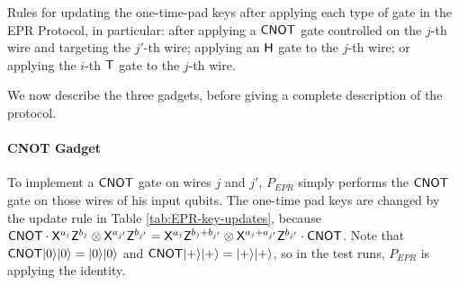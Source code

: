 \begin{table}[H]


\caption{Rules for updating the one-time-pad keys after applying each type of gate in the EPR Protocol, in particular: after applying a $\sf CNOT$ gate controlled on the $j$-th wire and targeting the $j'$-th wire;  applying an $\sf H$ gate to the $j$-th wire; or applying the $i$-th $\sf T$ gate to the $j$-th wire. 
}\label{tab:EPR-key-updates}
\end{table}

We now describe the three gadgets, before giving a complete description of the protocol. 

\paragraph{CNOT Gadget} To implement a $\sf CNOT$ gate on wires $j$ and $j'$, $P_{EPR}$ simply performs the $\sf CNOT$ gate on those wires of his input qubits. The one-time pad keys are changed by the update rule in Table \ref{tab:EPR-key-updates}, because ${\sf CNOT}\cdot {\sf X}^{a_j}{\sf Z}^{b_j}\otimes {\sf X}^{a_{j'}}{\sf Z}^{b_{j'}}={\sf X}^{a_j}{\sf Z}^{b_j+b_{j'}}\otimes {\sf X}^{a_j+a_{j'}}{\sf Z}^{b_{j'}}\cdot {\sf CNOT}$. Note that ${\sf CNOT}|0\rangle|0\rangle=|0\rangle|0\rangle$ and ${\sf CNOT}|+\rangle|+\rangle=|+\rangle|+\rangle$, so in the test runs, $P_{EPR}$ is applying the identity. 



